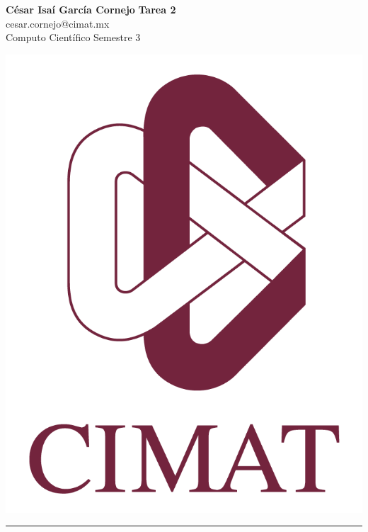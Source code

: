 \documentclass[a4paper, 11pt]{article}
\begin{document}
	\noindent
	
	\begin{minipage}[b][1.2cm][t]{0.8\textwidth}
		\large\textbf{César Isaí García Cornejo} \hfill \textbf{Tarea 2}  \\
		cesar.cornejo@cimat.mx \hfill \\
		\normalsize Computo Científico \hfill Semestre 3\\
	\end{minipage}
	
	\hspace{14.4cm}
	\begin{minipage}[b][0.03cm][t]{0.12\linewidth}
		
		\vspace{-2.2cm}
		\includegraphics[scale=0.3]{Figures/EscudoCimat.png}
	\end{minipage}
	
	\noindent\rule{7in}{2.8pt}
	
\end{document}
